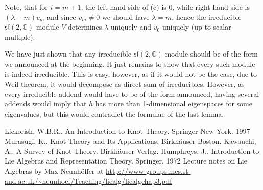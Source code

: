 \documentclass[10pt]{article} %
\theoremstyle{remark}
\newcommand{\sltwo}{\mathfrak{sl}(2,\mathbb{C})}
\begin{document}
Note, that for $i=m+1$, the left hand side of (c) is 0, while right hand side is $(\lambda-m)v_m$ and since $v_m\neq0$ we should have $\lambda=m$,
hence the irreducible $\sltwo$-module $V$ determines $\lambda$ uniquely and $v_0$ uniquely (up to scalar multiple).

We have just shown that any irreducible $\sltwo$-module should be of the form we announced at the beginning. It just remains to show that every
such module is indeed irreducible. This is easy, however, as if it would not be the case, due to Weil theorem, it would decompose as direct
sum of irreducibles. However, as every irreducible addend would have to be of the form announced, having several addends would imply that
$h$ has more than 1-dimensional eigenspaces for some eigenvalues, but this would contradict the formulae of the last lemma.
\begin{thebibliography}{9}
Lickorish, W.B.R.. An Introduction to Knot Theory. Springer New York. 1997
Murasugi, K.. Knot Theory and Its Applications. Birkhäuser Boston.
Kawauchi, A.. A Survey of Knot Theory. Birkhäuser Verlag.
Humphreys, J.. Introduction to Lie Algebras and Representation Theory. Springer. 1972
Lecture notes on Lie Algebras by Max Neunh\"offer at 
	\url{http://www-groups.mcs.st-and.ac.uk/~neunhoef/Teaching/liealg/liealgchap3.pdf}
\end{thebibliography}
\end{document}
